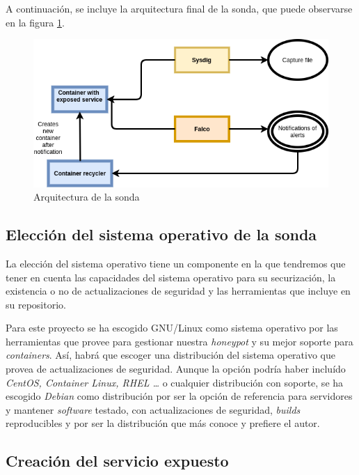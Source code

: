 A continuación, se incluye la arquitectura final de la sonda, que puede observarse en la figura \ref{fig:arquitectura-sonda}.

\begin{figure}[h]
    \centering
      \includegraphics[scale=0.5]{images/probe_architecture}
    \caption{Arquitectura de la sonda}
    \label{fig:arquitectura-sonda}
  \end{figure}

\subsection{Elección del sistema operativo de la sonda}
\label{subsec:sonda-so}
  
La elección del sistema operativo tiene un componente en la que tendremos que tener en cuenta las capacidades del sistema operativo para su securización,
la existencia o no de actualizaciones de seguridad y las herramientas que incluye en su repositorio.

Para este proyecto se ha escogido GNU/Linux como sistema operativo por las herramientas que provee para gestionar nuestra \emph{honeypot} y su mejor soporte
para \emph{containers}. Así, habrá que escoger una distribución del sistema operativo que provea de actualizaciones de seguridad. Aunque la opción podría haber incluído \emph{CentOS, Container Linux, RHEL \ldots} o cualquier distribución con soporte, se ha escogido \emph{Debian} como distribución por ser la opción de referencia para servidores y mantener \emph{software} testado, con actualizaciones de seguridad, 
\emph{builds} reproducibles y por ser la distribución que más conoce y prefiere el autor.


\subsection{Creación del servicio expuesto}

